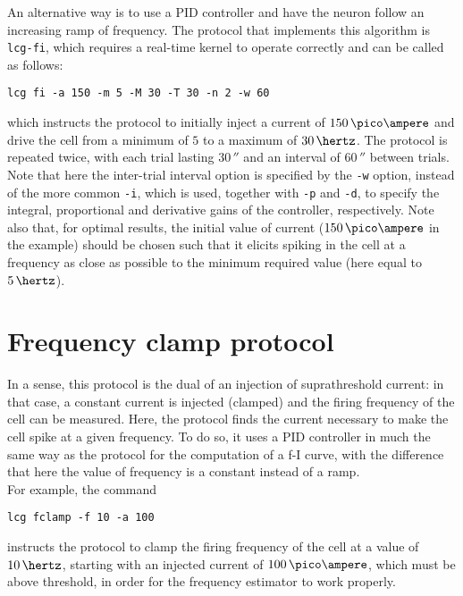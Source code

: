 An alternative way is to use a PID
controller and have the neuron follow an increasing ramp of
frequency. The protocol that implements this algorithm is
\verb+lcg-fi+, which requires a real-time kernel to operate correctly
and can be called as follows:
\begin{lstlisting}
lcg fi -a 150 -m 5 -M 30 -T 30 -n 2 -w 60
\end{lstlisting}
which instructs the protocol to initially inject a current of
$150\,\pico\ampere$ and drive the cell from a minimum of $5$ to a
maximum of $30\,\hertz$. The protocol is repeated twice, with each
trial lasting $30\,\second$ and an interval of $60\,\second$ between
trials. Note that here the inter-trial interval option is specified by
the \verb+-w+ option, instead of the more common \verb+-i+, which is
used, together with \verb+-p+ and \verb+-d+, to specify the integral,
proportional and derivative gains of the controller,
respectively. Note also that, for optimal results, the initial value
of current ($150\,\pico\ampere$ in the example) should be chosen such
that it elicits spiking in the cell at a frequency as close as
possible to the minimum required value (here equal to $5\,\hertz$).

\section{Frequency clamp protocol}\label{sec:fclamp}
In a sense, this protocol is the dual of an injection of
suprathreshold current: in that case, a constant current is injected
(clamped) and the firing frequency of the cell can be measured. Here,
the protocol finds the current necessary to make the cell spike at a
given frequency. To do so, it uses a PID controller in much the same
way as the protocol for the computation of a f-I curve, with the
difference that here the value of frequency is a constant instead of a
ramp.\\
For example, the command
\begin{lstlisting}
lcg fclamp -f 10 -a 100
\end{lstlisting}
instructs the protocol to clamp the firing frequency of the cell at a
value of $10\,\hertz$, starting with an injected current of
$100\,\pico\ampere$, which must be above threshold, in order for the
frequency estimator to work properly.

